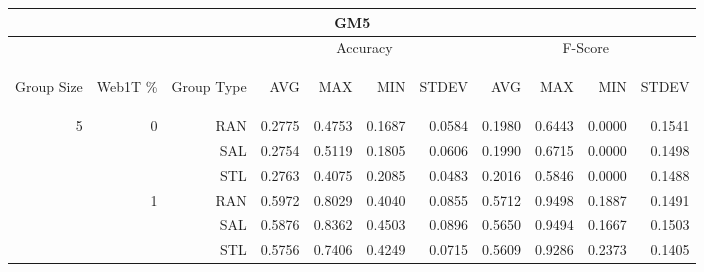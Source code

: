 \begin{center}
\begin{table}[htbp] 
 \begin{center}
\begin{tabular}{ | r | r | r | r | r | r | r | r | r | r | r |}
\hline
\multicolumn{11}{|c|}{GM5}\\
\hline
 & & & \multicolumn{4}{|c|}{Accuracy} & \multicolumn{4}{|c|}{F-Score}\\ \cline{4-11}
\begin{sideways}Group Size\end{sideways} & \begin{sideways}Web1T \%\end{sideways} & \begin{sideways}Group Type\end{sideways} & \begin{sideways}AVG\end{sideways} & \begin{sideways}MAX\end{sideways} & \begin{sideways}MIN\end{sideways} & \begin{sideways}STDEV\end{sideways} & \begin{sideways}AVG\end{sideways} & \begin{sideways}MAX\end{sideways} & \begin{sideways}MIN\end{sideways} & \begin{sideways}STDEV\end{sideways}\\
\hline
\multirow{17}{*}{5}
 & \multirow{3}{*}{0} & RAN & 0.2775 & 0.4753 & 0.1687 & 0.0584 & 0.1980 & 0.6443 & 0.0000 & 0.1541\\ \cline{3-11}
 &   & SAL & 0.2754 & 0.5119 & 0.1805 & 0.0606 & 0.1990 & 0.6715 & 0.0000 & 0.1498\\ \cline{3-11}
 &   & STL & 0.2763 & 0.4075 & 0.2085 & 0.0483 & 0.2016 & 0.5846 & 0.0000 & 0.1488\\ \cline{2-11}
 & \multirow{3}{*}{1} & RAN & 0.5972 & 0.8029 & 0.4040 & 0.0855 & 0.5712 & 0.9498 & 0.1887 & 0.1491\\ \cline{3-11}
 &   & SAL & 0.5876 & 0.8362 & 0.4503 & 0.0896 & 0.5650 & 0.9494 & 0.1667 & 0.1503\\ \cline{3-11}
 &   & STL & 0.5756 & 0.7406 & 0.4249 & 0.0715 & 0.5609 & 0.9286 & 0.2373 & 0.1405\\ \cline{2-11}

\end{tabular}
\end{center}
\end{table}
\end{center}
